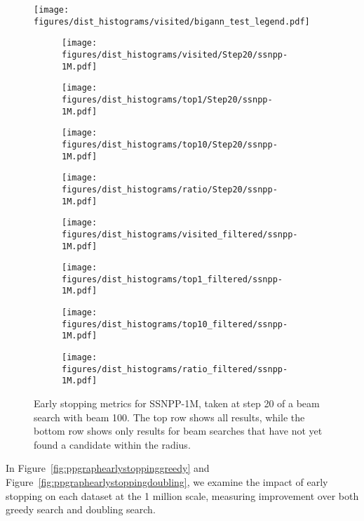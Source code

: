 \begin{figure*}
	\centering
	\texttt{[image: figures/dist\_histograms/visited/bigann\_test\_legend.pdf]} \\
	\begin{subfigure}{.24\textwidth}
		\texttt{[image: figures/dist\_histograms/visited/Step20/ssnpp-1M.pdf]}
	\end{subfigure}
	\begin{subfigure}{.24\textwidth}
		\texttt{[image: figures/dist\_histograms/top1/Step20/ssnpp-1M.pdf]}
	\end{subfigure}
	\begin{subfigure}{.24\textwidth}
		\texttt{[image: figures/dist\_histograms/top10/Step20/ssnpp-1M.pdf]}
	\end{subfigure}
	\begin{subfigure}{.24\textwidth}
		\texttt{[image: figures/dist\_histograms/ratio/Step20/ssnpp-1M.pdf]}
	\end{subfigure}
	\begin{subfigure}{.24\textwidth}
		\texttt{[image: figures/dist\_histograms/visited\_filtered/ssnpp-1M.pdf]}
	\end{subfigure}
	\begin{subfigure}{.24\textwidth}
		\texttt{[image: figures/dist\_histograms/top1\_filtered/ssnpp-1M.pdf]}
	\end{subfigure}
	\begin{subfigure}{.24\textwidth}
		\texttt{[image: figures/dist\_histograms/top10\_filtered/ssnpp-1M.pdf]}
	\end{subfigure}
	\begin{subfigure}{.24\textwidth}
		\texttt{[image: figures/dist\_histograms/ratio\_filtered/ssnpp-1M.pdf]}
	\end{subfigure}
	\caption{Early stopping metrics for SSNPP-1M, taken at step 20 of a beam search with beam 100. The top row shows all results, while the bottom row shows only results for beam searches that have not yet found a candidate within the radius.}
	\label{fig:ssnpp_earlystop}
\end{figure*}

In Figure~\ref{fig:ppgraphearlystoppinggreedy} and Figure~\ref{fig:ppgraphearlystoppingdoubling}, we examine the impact of early stopping on each dataset at the 1 million scale, measuring improvement over both greedy search and doubling search.

